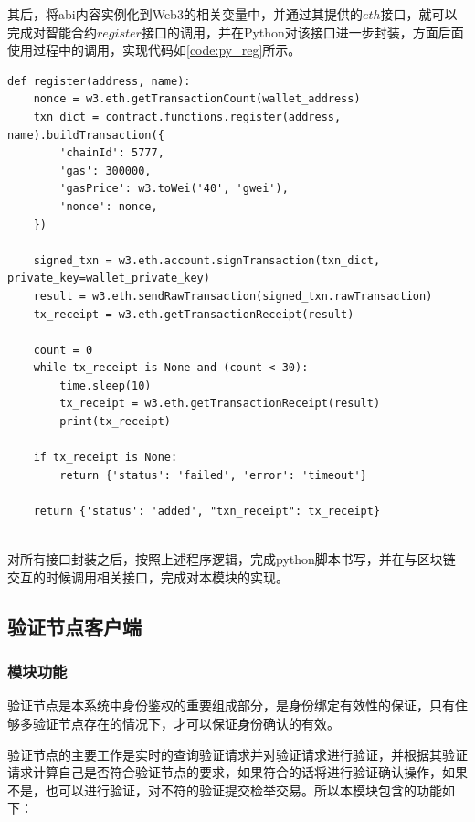 其后，将abi内容实例化到Web3的相关变量中，并通过其提供的$eth$接口，就可以完成对智能合约$register$接口的调用，并在Python对该接口进一步封装，方面后面使用过程中的调用，实现代码如\ref{code:py_reg}所示。
\begin{lstlisting}[caption={register接口封装}, label={code:py_reg}]
def register(address, name):
    nonce = w3.eth.getTransactionCount(wallet_address)
    txn_dict = contract.functions.register(address, name).buildTransaction({
        'chainId': 5777,
        'gas': 300000,
        'gasPrice': w3.toWei('40', 'gwei'),
        'nonce': nonce,
    })

    signed_txn = w3.eth.account.signTransaction(txn_dict, private_key=wallet_private_key)
    result = w3.eth.sendRawTransaction(signed_txn.rawTransaction)
    tx_receipt = w3.eth.getTransactionReceipt(result)

    count = 0
    while tx_receipt is None and (count < 30):
        time.sleep(10)
        tx_receipt = w3.eth.getTransactionReceipt(result)
        print(tx_receipt)

    if tx_receipt is None:
        return {'status': 'failed', 'error': 'timeout'}

    return {'status': 'added', "txn_receipt": tx_receipt}
	
\end{lstlisting}

对所有接口封装之后，按照上述程序逻辑，完成python脚本书写，并在与区块链交互的时候调用相关接口，完成对本模块的实现。



\subsection{验证节点客户端}

\subsubsection{模块功能}

验证节点是本系统中身份鉴权的重要组成部分，是身份绑定有效性的保证，只有住够多验证节点存在的情况下，才可以保证身份确认的有效。

验证节点的主要工作是实时的查询验证请求并对验证请求进行验证，并根据其验证请求计算自己是否符合验证节点的要求，如果符合的话将进行验证确认操作，如果不是，也可以进行验证，对不符的验证提交检举交易。所以本模块包含的功能如下：

